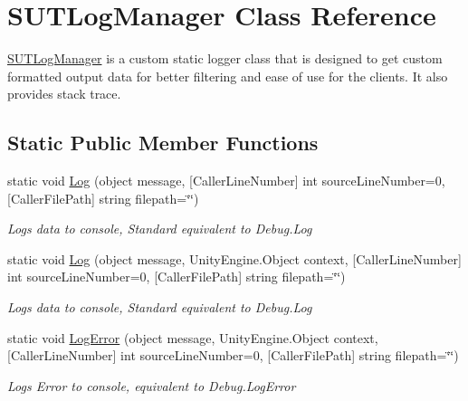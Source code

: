 \hypertarget{class_s_u_t_log_manager}{}\section{S\+U\+T\+Log\+Manager Class Reference}
\label{class_s_u_t_log_manager}


\mbox{\hyperlink{class_s_u_t_log_manager}{S\+U\+T\+Log\+Manager}} is a custom static logger class that is designed to get custom formatted output data for better filtering and ease of use for the clients. It also provides stack trace.  


\subsection*{Static Public Member Functions}
\begin{DoxyCompactItemize}
\item 
static void \mbox{\hyperlink{class_s_u_t_log_manager_a93ab3606fa0ca251e796f9383537c7ca}{Log}} (object message, \mbox{[}Caller\+Line\+Number\mbox{]} int source\+Line\+Number=0, \mbox{[}Caller\+File\+Path\mbox{]} string filepath=\char`\"{}\char`\"{})
\begin{DoxyCompactList}\small\item\em Logs data to console, Standard equivalent to Debug.\+Log \end{DoxyCompactList}\item 
static void \mbox{\hyperlink{class_s_u_t_log_manager_aa3f8070176715571ce2b8d43a97a8d88}{Log}} (object message, Unity\+Engine.\+Object context, \mbox{[}Caller\+Line\+Number\mbox{]} int source\+Line\+Number=0, \mbox{[}Caller\+File\+Path\mbox{]} string filepath=\char`\"{}\char`\"{})
\begin{DoxyCompactList}\small\item\em Logs data to console, Standard equivalent to Debug.\+Log \end{DoxyCompactList}\item 
static void \mbox{\hyperlink{class_s_u_t_log_manager_a26f1bf1459d00460dea0f3eda900ef5a}{Log\+Error}} (object message, Unity\+Engine.\+Object context, \mbox{[}Caller\+Line\+Number\mbox{]} int source\+Line\+Number=0, \mbox{[}Caller\+File\+Path\mbox{]} string filepath=\char`\"{}\char`\"{})
\begin{DoxyCompactList}\small\item\em Logs Error to console, equivalent to Debug.\+Log\+Error \end{DoxyCompactList}\item 

\end{DoxyCompactItemize}
